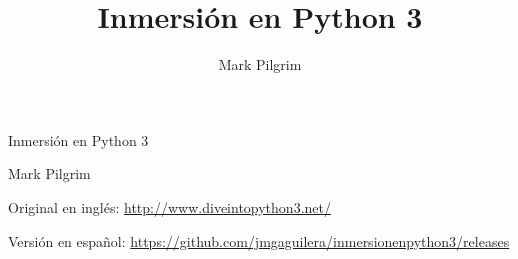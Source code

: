 \documentclass[12pt,leqno,a4paper,spanish]{book}
\title{Inmersión en Python 3}
\author{Mark Pilgrim}
\begin{document}
\pagestyle{empty}
\frontmatter


\vspace*{\fill}
\begin{center}

  {\Huge Inmersión en Python 3}

  \begin{latexonly}
\end{latexonly}

  {\Large Mark Pilgrim}


\end{center}
\vspace{\fill}
\vspace{\fill}

\begin{flushright}
  Original en inglés: \href{http://www.diveintopython3.net/}{http://www.diveintopython3.net/}

  Versión en español: \href{https://github.com/jmgaguilera/inmersionenpython3/releases}{https://github.com/jmgaguilera/inmersionenpython3/releases} 
\end{flushright}

\clearpage

\pagestyle{headings}



\tableofcontents
\cleardoublepage

\pagestyle{headings}


















\appendix





\printindex
\end{document}
